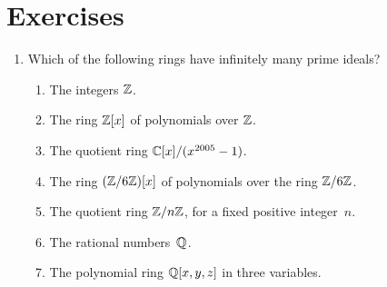 \chapter{Exercises}
\label{ch:ex1}
\begin{enumerate}



\item Which of the following rings have infinitely %
many prime ideals?  
\begin{enumerate}
\item The integers $\mathbb{Z}$. 
\item The ring $\mathbb{Z}[x]$ of polynomials over $\mathbb{Z}$.
\item The quotient ring $\mathbb{C}[x]/(x^{2005}-1)$.
\item The ring $(\mathbb{Z}/6\mathbb{Z})[x]$ of polynomials over the ring $\mathbb{Z}/6\mathbb{Z}$.
\item The quotient ring $\mathbb{Z}/n\mathbb{Z}$, for a fixed positive integer~$n$.
\item The rational numbers~$\mathbb{Q}$.
\item The polynomial ring $\mathbb{Q}[x,y,z]$ in three variables.
\end{enumerate}



\end{enumerate}

